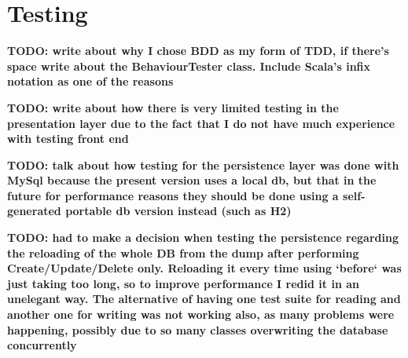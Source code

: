 \section{Testing} \label{sec:Testing}

\textbf{TODO: write about why I chose BDD as my form of TDD, if there's space
write about the BehaviourTester class. Include Scala's infix notation as one of
the reasons}

\textbf{TODO: write about how there is very limited testing in the presentation
layer due to the fact that I do not have much experience with testing front
end}


\textbf{TODO: talk about how testing for the persistence layer was done with
MySql because the present version uses a local db, but that in the future for
performance reasons they should be done using a self-generated portable db
version instead (such as H2)}

\textbf{TODO: had to make a decision when testing the persistence regarding the
reloading of the whole DB from the dump after performing Create/Update/Delete only.
Reloading it every time using `before` was just taking too long, so to improve
performance I redid it in an unelegant way. The alternative of having one test suite for 
reading and another one for writing was not working also, as many problems were happening,
possibly due to so many classes overwriting the database concurrently}
